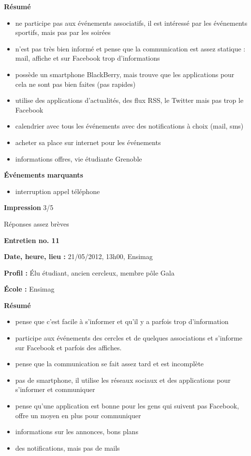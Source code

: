\documentclass[a4paper, 11px]{article}
\begin{document}
\textbf{Résumé}
	\begin{itemize}
		\item ne participe pas aux événements associatifs, il est intéressé par les événements sportifs, mais pas par les soirées
		\item n'est pas très bien informé et pense que la communication est assez statique : mail, affiche et sur Facebook trop d'informations
		\item possède un smartphone BlackBerry, mais trouve que les applications pour cela ne sont pas bien faites (pas rapides)
		\item utilise des applications d'actualités, des flux RSS, le Twitter mais pas trop le Facebook
		\item calendrier avec tous les événements avec des notifications à choix (mail, sms)
		\item acheter sa place sur internet pour les événements
		\item informations offres, vie étudiante Grenoble
	\end{itemize}

\vspace{.25cm}
\textbf{Événements marquants}
	\begin{itemize}
		\item interruption appel téléphone
	\end{itemize}
\vspace{.25cm}

\textbf{Impression}
3/5

Réponses assez brèves


\vspace{.3cm}

 \textbf {\large Entretien no. 11}

\textbf{Date, heure, lieu : }
21/05/2012, 13h00, Ensimag

\textbf{Profil : }
Élu étudiant, ancien cercleux, membre pôle Gala

\textbf{École : }
Ensimag

\textbf{Résumé}
	\begin{itemize}

		\item pense que c'est facile à s'informer et qu'il y a parfois trop d'information
		\item participe aux événements des cercles et de quelques associations et s'informe sur Facebook et parfois des affiches.
		\item pense que la communication se fait assez tard et est incomplète
		\item pas de smartphone, il utilise les réseaux sociaux et des applications pour s'informer et communiquer
		\item pense qu'une application est bonne pour les gens qui suivent pas Facebook, offre un moyen en plus pour communiquer
		\item informations sur les annonces, bons plans
		\item des notifications, mais pas de mails
	\end{itemize}
\end{document}
